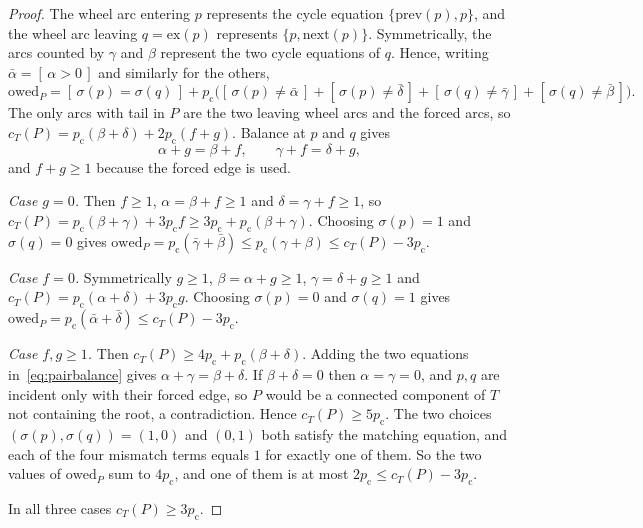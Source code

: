 \documentclass[11pt]{amsart}
\theoremstyle{definition}
\theoremstyle{remark}
\numberwithin{equation}{section}
\newcommand{\iv}[1]{[\,#1\,]}
\newcommand{\ex}{\mathrm{ex}}
\newcommand{\nxt}{\mathrm{next}}
\newcommand{\prv}{\mathrm{prev}}
\newcommand{\owed}{\mathrm{owed}}
\newcommand{\pc}{p_{\mathrm{c}}}
\begin{document}
\begin{proof}
The wheel arc entering $p$ represents the cycle equation $\{\prv(p),p\}$, and the wheel arc leaving $q=\ex(p)$ represents $\{p,\nxt(p)\}$. Symmetrically, the arcs counted by $\gamma$ and $\beta$ represent the two cycle equations of $q$. Hence, writing $\bar\alpha=\iv{\alpha>0}$ and similarly for the others,
\[
\owed_P=\iv{\sigma(p)=\sigma(q)}+\pc\bigl(\iv{\sigma(p)\ne\bar\alpha}+\iv{\sigma(p)\ne\bar\delta}+\iv{\sigma(q)\ne\bar\gamma}+\iv{\sigma(q)\ne\bar\beta}\bigr).
\]
The only arcs with tail in $P$ are the two leaving wheel arcs and the forced arcs, so $c_T(P)=\pc(\beta+\delta)+2\pc(f+g)$. Balance at $p$ and $q$ gives
\begin{equation}\label{eq:pairbalance}
\alpha+g=\beta+f,\qquad \gamma+f=\delta+g,
\end{equation}
and $f+g\ge1$ because the forced edge is used.

\emph{Case $g=0$.} Then $f\ge1$, $\alpha=\beta+f\ge1$ and $\delta=\gamma+f\ge1$, so $c_T(P)=\pc(\beta+\gamma)+3\pc f\ge3\pc+\pc(\beta+\gamma)$. Choosing $\sigma(p)=1$ and $\sigma(q)=0$ gives $\owed_P=\pc(\bar\gamma+\bar\beta)\le\pc(\gamma+\beta)\le c_T(P)-3\pc$.

\emph{Case $f=0$.} Symmetrically $g\ge1$, $\beta=\alpha+g\ge1$, $\gamma=\delta+g\ge1$ and $c_T(P)=\pc(\alpha+\delta)+3\pc g$. Choosing $\sigma(p)=0$ and $\sigma(q)=1$ gives $\owed_P=\pc(\bar\alpha+\bar\delta)\le c_T(P)-3\pc$.

\emph{Case $f,g\ge1$.} Then $c_T(P)\ge4\pc+\pc(\beta+\delta)$. Adding the two equations in~\eqref{eq:pairbalance} gives $\alpha+\gamma=\beta+\delta$. If $\beta+\delta=0$ then $\alpha=\gamma=0$, and $p,q$ are incident only with their forced edge, so $P$ would be a connected component of $T$ not containing the root, a contradiction. Hence $c_T(P)\ge5\pc$. The two choices $(\sigma(p),\sigma(q))=(1,0)$ and $(0,1)$ both satisfy the matching equation, and each of the four mismatch terms equals $1$ for exactly one of them. So the two values of $\owed_P$ sum to $4\pc$, and one of them is at most $2\pc\le c_T(P)-3\pc$.

In all three cases $c_T(P)\ge3\pc$.
\end{proof}
\end{document}

